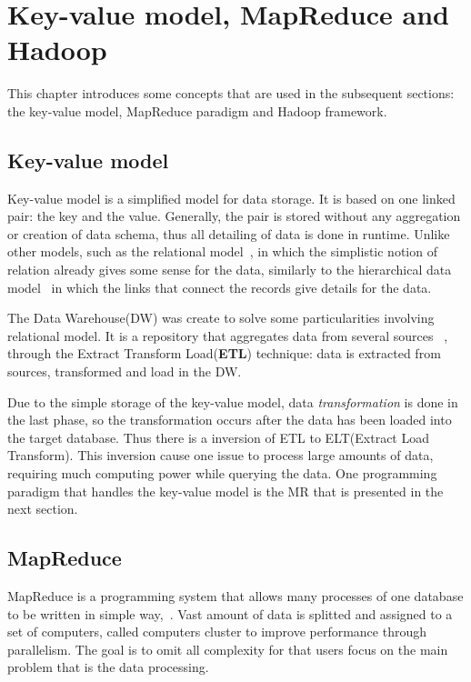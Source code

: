 \chapter{Key-value model, MapReduce and Hadoop} %
\label{cha:background}

This chapter introduces some concepts that are used in the subsequent sections:
the key-value model, MapReduce paradigm and Hadoop framework.

\section{Key-value model}\label{section:mapreduce}

Key-value model is a simplified model for data storage. It is based on one linked
pair: the key and the value. Generally, the pair is stored without any aggregation or
creation of data schema, thus all detailing of data is done in runtime. Unlike
other models, such as the relational model~\cite{codd:1970}, in which the simplistic
notion of relation already gives some sense for the data, similarly to the hierarchical
data model~\cite{silber:2005} in which the links that connect the records give
details for the data.

The Data Warehouse(DW) was create to solve some particularities involving relational
model. It is a repository that aggregates data from several sources ~\cite{silber:2005},
through the Extract Transform Load(\textbf{ETL}) technique: data is extracted from
sources, transformed and load in the DW.

Due to the simple storage of the key-value model, data \textit{transformation}
is done in the last phase, so the transformation occurs after the data has been
loaded into the target database. Thus there is a inversion of ETL to ELT(Extract Load Transform).
This inversion cause one issue to process large amounts of data, requiring much
computing power while querying the data. One programming paradigm that handles the
key-value model is the MR that is presented in the next section.

\section{MapReduce}\label{section:mapreduce}
MapReduce is a programming system that allows many processes of one
database to be written in simple way,~\cite{molina:2009}. Vast amount of data
is splitted and assigned to a set of computers, called computers cluster to improve
performance through parallelism. The goal is to omit all complexity for that users
focus on the main problem that is the data processing.

